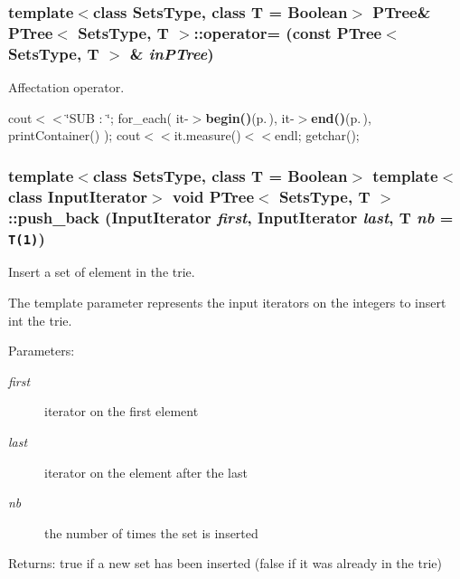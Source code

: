 \subsubsection{\setlength{\rightskip}{0pt plus 5cm}template$<$class Sets\-Type, class T = Boolean$>$ {\bf PTree}\& {\bf PTree}$<$ Sets\-Type, T $>$::operator= (const {\bf PTree}$<$ Sets\-Type, T $>$ \& {\em in\-PTree})\hspace{0.3cm}{\tt  [inline]}}\label{class_p_tree_0b0f87710d37e03751bb0fc07b109464}


Affectation operator. 

cout$<$$<$\char`\"{}SUB  : \char`\"{}; for\_\-each( it-$>${\bf begin()}{\rm (p.\,\pageref{class_p_tree_3b8dac8ae570e9194aeece6fb1de32a2})}, it-$>${\bf end()}{\rm (p.\,\pageref{class_p_tree_4bed11f5f1b7c6a8821cb962cf174751})}, print\-Container() ); cout$<$$<$it.measure()$<$$<$endl; getchar(); 
\subsubsection{\setlength{\rightskip}{0pt plus 5cm}template$<$class Sets\-Type, class T = Boolean$>$ template$<$class Input\-Iterator$>$ void {\bf PTree}$<$ Sets\-Type, T $>$::push\_\-back (Input\-Iterator {\em first}, Input\-Iterator {\em last}, T {\em nb} = {\tt T(1)})\hspace{0.3cm}{\tt  [inline]}}\label{class_p_tree_728345ce3e2c137ce2e16258847004be}


Insert a set of element in the trie. 

The template parameter represents the input iterators on the integers to insert int the trie. \begin{Desc}
\item[Parameters:]
\begin{description}
\item[{\em first}]iterator on the first element \item[{\em last}]iterator on the element after the last \item[{\em nb}]the number of times the set is inserted \end{description}
\end{Desc}
\begin{Desc}
\item[Returns:]true if a new set has been inserted (false if it was already in the trie) \end{Desc}
